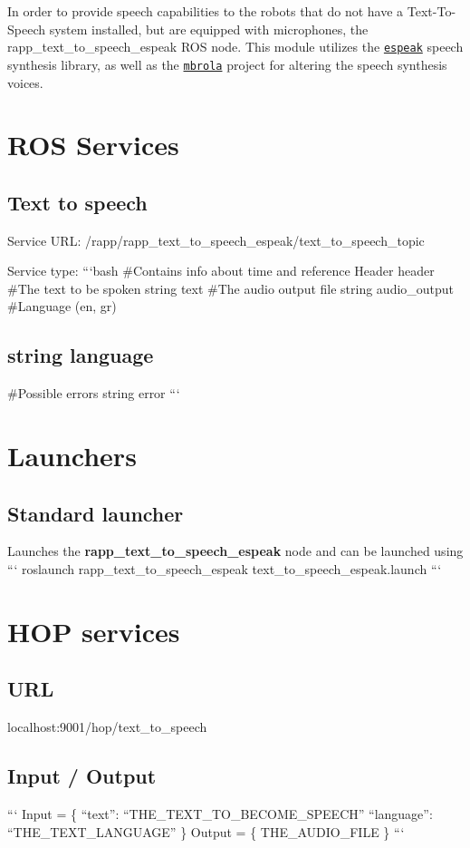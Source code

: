 In order to provide speech capabilities to the robots that do not have a Text-\/\-To-\/\-Speech system installed, but are equipped with microphones, the {\ttfamily rapp\-\_\-text\-\_\-to\-\_\-speech\-\_\-espeak} R\-O\-S node. This module utilizes the \href{http://espeak.sourceforge.net/}{\tt espeak} speech synthesis library, as well as the \href{http://tcts.fpms.ac.be/synthesis/mbrola.html}{\tt mbrola} project for altering the speech synthesis voices.

\section*{R\-O\-S Services}

\subsection*{Text to speech}

Service U\-R\-L\-: {\ttfamily /rapp/rapp\-\_\-text\-\_\-to\-\_\-speech\-\_\-espeak/text\-\_\-to\-\_\-speech\-\_\-topic}

Service type\-: ```bash \#\-Contains info about time and reference Header header \#\-The text to be spoken string text \#\-The audio output file string audio\-\_\-output \#\-Language (en, gr) \subsection*{string language }

\#\-Possible errors string error ```

\section*{Launchers}

\subsection*{Standard launcher}

Launches the {\bfseries rapp\-\_\-text\-\_\-to\-\_\-speech\-\_\-espeak} node and can be launched using ``` roslaunch rapp\-\_\-text\-\_\-to\-\_\-speech\-\_\-espeak text\-\_\-to\-\_\-speech\-\_\-espeak.\-launch ```

\section*{H\-O\-P services}

\subsection*{U\-R\-L}

{\ttfamily localhost\-:9001/hop/text\-\_\-to\-\_\-speech}

\subsection*{Input / Output}

``` Input = \{ “text”\-: “\-T\-H\-E\-\_\-\-T\-E\-X\-T\-\_\-\-T\-O\-\_\-\-B\-E\-C\-O\-M\-E\-\_\-\-S\-P\-E\-E\-C\-H” “language”\-: “\-T\-H\-E\-\_\-\-T\-E\-X\-T\-\_\-\-L\-A\-N\-G\-U\-A\-G\-E” \} {\ttfamily  } Output = \{ T\-H\-E\-\_\-\-A\-U\-D\-I\-O\-\_\-\-F\-I\-L\-E \} ``` 